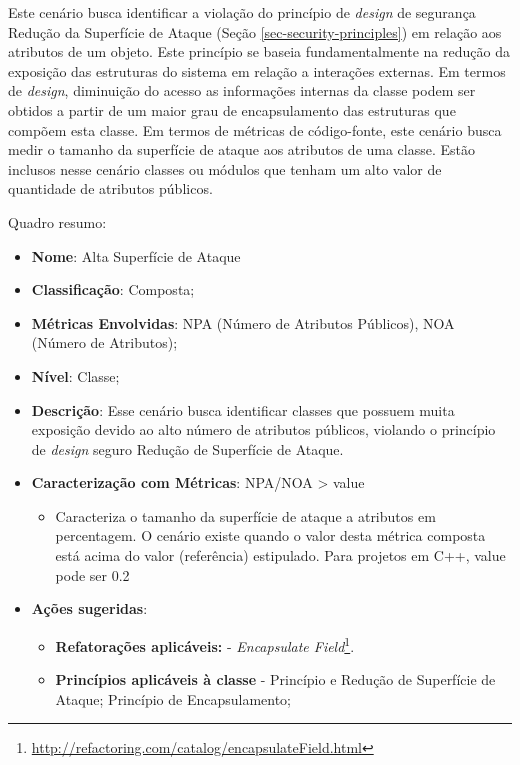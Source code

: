 Este cenário busca identificar a violação do princípio de \emph{design} de segurança Redução da Superfície de Ataque (Seção \ref{sec-security-principles}) em relação aos atributos de um objeto. 
%
Este princípio se baseia fundamentalmente na redução da exposição das estruturas do sistema em relação a interações externas. Em termos de \emph{design}, diminuição do acesso as informações internas da classe podem ser obtidos a partir de um maior grau de encapsulamento das estruturas que compõem esta classe. 
%
Em termos de métricas de código-fonte, este cenário busca medir o tamanho da superfície de ataque aos atributos de uma classe. Estão inclusos nesse cenário classes ou módulos que tenham um alto valor de quantidade de atributos públicos. 

%

Quadro resumo:

\begin{itemize}
\item \textbf{Nome}: Alta Superfície de Ataque
\item \textbf{Classificação}: Composta;
\item \textbf{Métricas Envolvidas}: NPA (Número de Atributos Públicos), NOA (Número de Atributos);
\item \textbf{Nível}: Classe;
\item \textbf{Descrição}: Esse cenário busca identificar classes que possuem muita exposição devido ao alto número de atributos públicos, violando o princípio de \emph{design} seguro Redução de Superfície de Ataque.
\item \textbf{Caracterização com Métricas}: NPA/NOA > value
	\begin{itemize}
	\item Caracteriza o tamanho da superfície de ataque a atributos em percentagem. O cenário existe quando o valor desta métrica composta está acima do valor (referência) estipulado. Para projetos em C++, value pode ser 0.2
	\end{itemize}
\item \textbf{Ações sugeridas}:
	\begin{itemize}
	\item \textbf{Refatorações aplicáveis:} - \emph{Encapsulate Field}\footnote{\url{http://refactoring.com/catalog/encapsulateField.html}}.
	\item \textbf{Princípios aplicáveis à classe} - Princípio e Redução de Superfície de Ataque; Princípio de Encapsulamento;
	\end{itemize}
\end{itemize}

